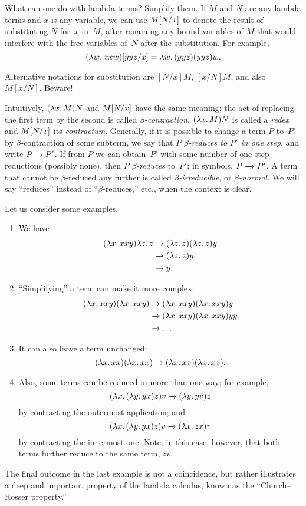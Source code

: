 \documentclass[../../../include/open-logic-section]{subfiles}
\begin{document}

What can one do with lambda terms? Simplify them. If $M$ and $N$ are
any lambda terms and $x$ is any variable, we can use $M[N/x]$ to
denote the result of substituting $N$ for~$x$ in~$M$, after renaming
any bound variables of $M$ that would interfere with the free
variables of~$N$ after the substitution. For example,
\[
\Subst{(\lambd[w][xxw])}{yyz}{x} = \lambd[w][(yyz)(yyz)w].
\]

\begin{digress}
Alternative notations for substitution are $[N/x]M$, $[x/N]M$, and
also $M[x/N]$. Beware!
\end{digress}

Intuitively, $(\lambd[x][M])N$ and $M[N/x]$ have the same
meaning; the act of replacing the first term by the second is called
\emph{$\beta$-contraction}. $(\lambd[x][M])N$ is called a \emph{redex}
and $M[N/x]$ its \emph{contractum}. Generally, if it is
possible to change a term $P$ to~$P'$ by $\beta$-contraction of some
subterm, we say that $P$ \emph{$\beta$-reduces to $P'$ in one step},
and write $P \redone P'$. If from $P$ we can obtain~$P'$ with some
number of one-step reductions (possibly none), then $P$
\emph{$\beta$-reduces} to~$P'$; in symbols, $P \red P'$. A term that
cannot be $\beta$-reduced any further is called
\emph{$\beta$-irreducible}, or \emph{$\beta$-normal}. We will say
``reduces'' instead of ``$\beta$-reduces,'' etc., when the context is
clear.

Let us consider some examples.
\begin{enumerate}
\item We have
\begin{align*}
(\lambd[x][xxy]) \lambd[z][z] & \redone (\lambd[z][z])(\lambd[z][z]) y \\
& \redone (\lambd[z][z]) y \\
& \redone y.
\end{align*}
\item ``Simplifying'' a term can make it more complex:
\begin{align*}
(\lambd[x][xxy])(\lambd[x][xxy]) & \redone (\lambd[x][xxy])(\lambd[x][xxy])y \\
& \redone (\lambd[x][xxy])(\lambd[x][xxy])yy \\
& \redone \dots
\end{align*}
\item It can also leave a term unchanged:
\[
(\lambd[x][xx])(\lambd[x][xx]) \redone (\lambd[x][xx])(\lambd[x][xx]).
\]
\item Also, some terms can be reduced in more than one way; for
  example,
\[
(\lambd[x][(\lambd[y][yx]) z)] v \redone (\lambd[y][yv]) z
\]
by contracting the outermost application; and
\[
(\lambd[x][(\lambd[y][yx]) z)] v \redone (\lambd[x][zx]) v
\]
by contracting the innermost one. Note, in this case, however, that
both terms further reduce to the same term, $zv$.
\end{enumerate}

The final outcome in the last example is not a coincidence, but rather
illustrates a deep and important property of the lambda calculus, known as the
``Church--Rosser property.''
\end{document}
